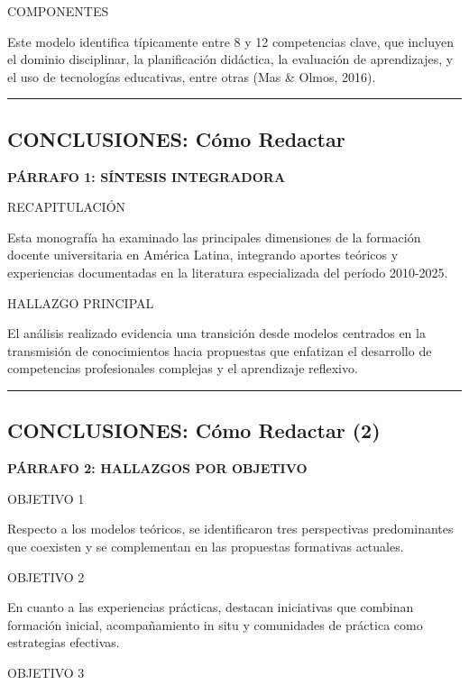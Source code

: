 \documentclass[
  11pt,
]{beaner}
\begin{document}
{COMPONENTES}

Este modelo identifica típicamente entre 8 y 12 competencias clave, que
incluyen el dominio disciplinar, la planificación didáctica, la
evaluación de aprendizajes, y el uso de tecnologías educativas, entre
otras (Mas \& Olmos, 2016).

\begin{center}\rule{0.5\linewidth}{0.5pt}\end{center}

\subsection{CONCLUSIONES: Cómo
Redactar}\label{conclusiones-cuxf3mo-redactar}

\textbf{PÁRRAFO 1: SÍNTESIS INTEGRADORA}

{RECAPITULACIÓN}

Esta monografía ha examinado las principales dimensiones de la formación
docente universitaria en América Latina, integrando aportes teóricos y
experiencias documentadas en la literatura especializada del período
2010-2025.

{HALLAZGO PRINCIPAL}

El análisis realizado evidencia una transición desde modelos centrados
en la transmisión de conocimientos hacia propuestas que enfatizan el
desarrollo de competencias profesionales complejas y el aprendizaje
reflexivo.

\begin{center}\rule{0.5\linewidth}{0.5pt}\end{center}

\subsection{CONCLUSIONES: Cómo Redactar
(2)}\label{conclusiones-cuxf3mo-redactar-2}

\textbf{PÁRRAFO 2: HALLAZGOS POR OBJETIVO}

{OBJETIVO 1}

Respecto a los modelos teóricos, se identificaron tres perspectivas
predominantes que coexisten y se complementan en las propuestas
formativas actuales.

{OBJETIVO 2}

En cuanto a las experiencias prácticas, destacan iniciativas que
combinan formación inicial, acompañamiento in situ y comunidades de
práctica como estrategias efectivas.

{OBJETIVO 3}
\end{document}
